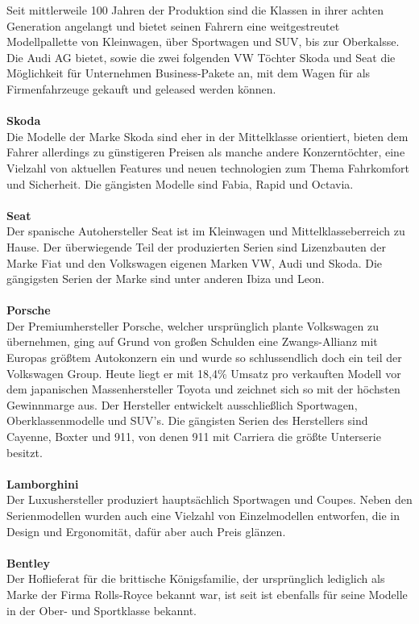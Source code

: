\documentclass[12pt]{article}
\begin{document}
Seit mittlerweile 100 Jahren der Produktion sind die Klassen in ihrer achten Generation angelangt und bietet seinen Fahrern eine weitgestreutet Modellpallette von Kleinwagen, über Sportwagen und SUV, bis zur Oberkalsse. Die Audi AG bietet, sowie die zwei folgenden VW Töchter Skoda und Seat die Möglichkeit für Unternehmen Business-Pakete an, mit dem Wagen für als Firmenfahrzeuge gekauft und geleased werden können.\\
\\
\textbf{Skoda}\\
Die Modelle der Marke Skoda sind eher in der Mittelklasse orientiert, bieten dem Fahrer allerdings zu günstigeren Preisen als manche andere Konzerntöchter, eine Vielzahl von aktuellen Features und neuen technologien zum Thema Fahrkomfort und Sicherheit. Die gängisten Modelle sind Fabia, Rapid und Octavia.\\
\\
\textbf{Seat}\\
Der spanische Autohersteller Seat ist im Kleinwagen und Mittelklasseberreich zu Hause. Der überwiegende Teil der produzierten Serien sind Lizenzbauten der Marke Fiat und den Volkswagen eigenen Marken VW, Audi und Skoda.
Die gängigsten Serien der Marke sind unter anderen Ibiza und Leon.\\
\\ 
\textbf{Porsche}\\
Der Premiumhersteller Porsche, welcher ursprünglich plante Volkswagen zu übernehmen, ging auf Grund von großen Schulden eine Zwangs-Allianz mit Europas größtem Autokonzern ein und wurde so schlussendlich doch ein teil der Volkswagen Group.
Heute liegt er mit 18,4\% Umsatz pro verkauften Modell vor dem japanischen Massenhersteller Toyota und zeichnet sich so mit der höchsten Gewinnmarge aus.
Der Hersteller entwickelt ausschließlich Sportwagen, Oberklassenmodelle und SUV's.
Die gängisten Serien des Herstellers sind Cayenne, Boxter und 911, von denen 911 mit Carriera die größte Unterserie besitzt.\\
\\
\textbf{Lamborghini}\\
Der Luxushersteller produziert hauptsächlich Sportwagen und Coupes. Neben den Serienmodellen wurden auch eine
Vielzahl von Einzelmodellen entworfen, die in Design und Ergonomität, dafür aber auch Preis glänzen.\\
\\
\textbf{Bentley}\\
Der Hoflieferat für die brittische Königsfamilie, der ursprünglich lediglich als Marke der Firma Rolls-Royce bekannt war, ist seit  ist ebenfalls für seine Modelle in der Ober- und Sportklasse bekannt.\\
\end{document}
